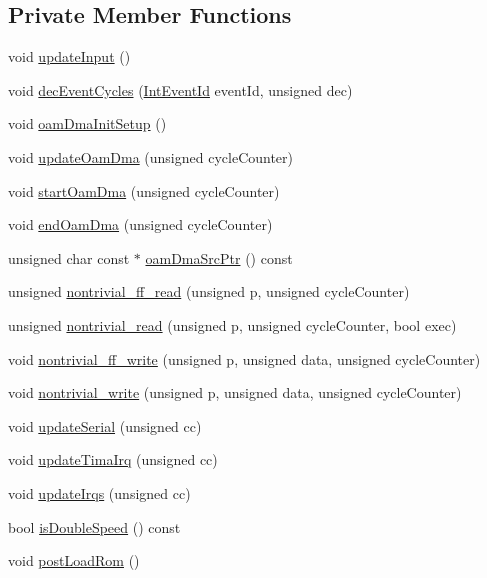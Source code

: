 \subsection*{Private Member Functions}
\begin{DoxyCompactItemize}
\item 
void \hyperlink{classgambatte_1_1Memory_a95b92fe66c06b9694ed31c8535a0479c}{update\+Input} ()
\item 
void \hyperlink{classgambatte_1_1Memory_a2ea1cb0bdcc6e3e7124be5a938a57ac6}{dec\+Event\+Cycles} (\hyperlink{namespacegambatte_a0cc3dd7d4d26f0466e9eeda6242755d9}{Int\+Event\+Id} event\+Id, unsigned dec)
\item 
void \hyperlink{classgambatte_1_1Memory_af092fa032a019af9a7af862483439cac}{oam\+Dma\+Init\+Setup} ()
\item 
void \hyperlink{classgambatte_1_1Memory_ab6676bde82a9eb9253922f2791346bae}{update\+Oam\+Dma} (unsigned cycle\+Counter)
\item 
void \hyperlink{classgambatte_1_1Memory_a0c7ab1d1f0713c019097debfff8867b8}{start\+Oam\+Dma} (unsigned cycle\+Counter)
\item 
void \hyperlink{classgambatte_1_1Memory_a63ef4bb208fcaf48541c916fbdfd70e9}{end\+Oam\+Dma} (unsigned cycle\+Counter)
\item 
unsigned char const  $\ast$ \hyperlink{classgambatte_1_1Memory_a77408b82e768d9a2924716da30a2f88b}{oam\+Dma\+Src\+Ptr} () const
\item 
unsigned \hyperlink{classgambatte_1_1Memory_af4284a0bfb2865d5ca79fcbf0427f77c}{nontrivial\+\_\+ff\+\_\+read} (unsigned p, unsigned cycle\+Counter)
\item 
unsigned \hyperlink{classgambatte_1_1Memory_ae7393a1578c788b997be89f3aa3971af}{nontrivial\+\_\+read} (unsigned p, unsigned cycle\+Counter, bool exec)
\item 
void \hyperlink{classgambatte_1_1Memory_ab2b597b7bd82a603cf58dd3c5bda9318}{nontrivial\+\_\+ff\+\_\+write} (unsigned p, unsigned data, unsigned cycle\+Counter)
\item 
void \hyperlink{classgambatte_1_1Memory_aa5c3d97ab4976b855816d5a21fe966bd}{nontrivial\+\_\+write} (unsigned p, unsigned data, unsigned cycle\+Counter)
\item 
void \hyperlink{classgambatte_1_1Memory_a552e36b5b76b95b760a52f0dfaa1b145}{update\+Serial} (unsigned cc)
\item 
void \hyperlink{classgambatte_1_1Memory_a52646efd8c7591d255033004cd4900e9}{update\+Tima\+Irq} (unsigned cc)
\item 
void \hyperlink{classgambatte_1_1Memory_aca3a8cc1e11b19a3f566f5413cfff877}{update\+Irqs} (unsigned cc)
\item 
bool \hyperlink{classgambatte_1_1Memory_a56d5c1ca844bbe948e8bda12de90b006}{is\+Double\+Speed} () const
\item 
void \hyperlink{classgambatte_1_1Memory_a6458a2af3ab6d2d68e81966347257151}{post\+Load\+Rom} ()
\end{DoxyCompactItemize}
